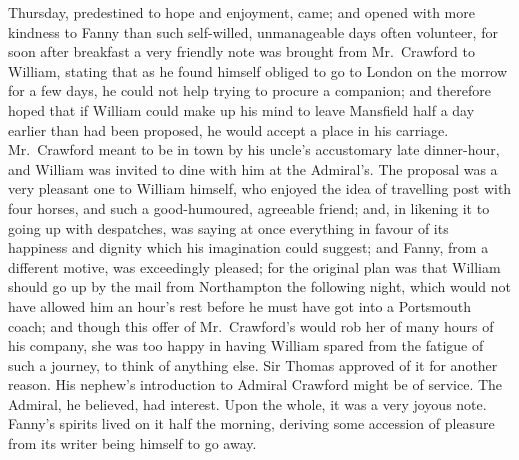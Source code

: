 Thursday, predestined to hope and enjoyment, came; and opened
with more kindness to Fanny than such self-willed,
unmanageable days often volunteer, for soon after breakfast
a very friendly note was brought from Mr.\ Crawford
to William, stating that as he found himself obliged
to go to London on the morrow for a few days, he could
not help trying to procure a companion; and therefore
hoped that if William could make up his mind to leave
Mansfield half a day earlier than had been proposed,
he would accept a place in his carriage.  Mr.\ Crawford meant
to be in town by his uncle's accustomary late dinner-hour,
and William was invited to dine with him at the Admiral's.
The proposal was a very pleasant one to William himself,
who enjoyed the idea of travelling post with four horses,
and such a good-humoured, agreeable friend; and, in likening
it to going up with despatches, was saying at once everything
in favour of its happiness and dignity which his imagination
could suggest; and Fanny, from a different motive,
was exceedingly pleased; for the original plan was that
William should go up by the mail from Northampton the
following night, which would not have allowed him an hour's
rest before he must have got into a Portsmouth coach;
and though this offer of Mr.\ Crawford's would rob her
of many hours of his company, she was too happy in having
William spared from the fatigue of such a journey,
to think of anything else.  Sir Thomas approved of it
for another reason.  His nephew's introduction to Admiral
Crawford might be of service.  The Admiral, he believed,
had interest.  Upon the whole, it was a very joyous note.
Fanny's spirits lived on it half the morning, deriving
some accession of pleasure from its writer being himself to go
away.

